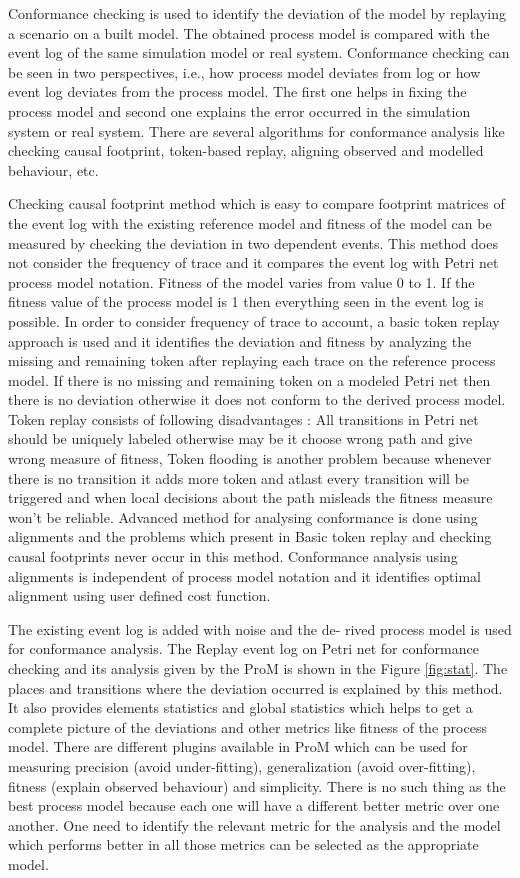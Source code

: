 \documentclass[conference]{IEEEtran}
\begin{document}
Conformance checking is used to identify the deviation of the model by replaying a scenario on a built model. The obtained process model is compared with the event log of the same simulation model or real system. Conformance checking can be seen in two perspectives, i.e., how process model deviates from log or how event log deviates from the process model. The first one helps in fixing the process model and second one explains the error occurred in the simulation system or real system. There are several algorithms for conformance analysis like checking causal footprint, token-based replay, aligning observed and modelled behaviour, etc.


Checking causal footprint method which is easy to compare footprint matrices of the event log with the existing reference model and fitness of the model can be measured by checking the deviation in two dependent events. This method does not consider the frequency of trace and it compares the event log with Petri net process model notation. Fitness of the model varies from value 0 to 1. If the fitness value of the process model is 1 then everything seen in the event log is possible. In order to consider frequency of trace to account, a basic token replay approach is used and it identifies the deviation and fitness by analyzing the missing and remaining token after replaying each trace on the reference process model. If there is no missing and remaining token on a modeled Petri net then there is no deviation otherwise it does not conform to the derived process model. Token replay consists of following disadvantages : All transitions in Petri net should be uniquely labeled otherwise may be it choose wrong path and give wrong measure of fitness, Token flooding is another problem because whenever there is no transition it adds more token and atlast every transition will be triggered and when local decisions about the path misleads the fitness measure won’t be reliable. Advanced method for analysing conformance is done using alignments and the problems which present in Basic token replay and checking causal footprints never occur in this method. Conformance analysis using alignments is independent of process model notation and it identifies optimal alignment using user defined cost function.
 

The existing event log is added with noise and the de- rived process model is used for conformance analysis. The Replay event log on Petri net for conformance checking and its analysis given by the ProM is shown in the Figure \ref{fig:stat}. The places and transitions where the deviation occurred is explained by this method. It also provides elements statistics and global statistics which helps to get a complete picture of the deviations and other metrics like fitness of the process model. There are different plugins available in ProM which can be used for measuring precision (avoid under-fitting), generalization (avoid over-fitting), fitness (explain observed behaviour) and simplicity. There is no such thing as the best process model because each one will have a different better metric over one another. One need to identify the relevant metric for the analysis and the model which performs better in all those metrics can be selected as the appropriate model.
\end{document}
